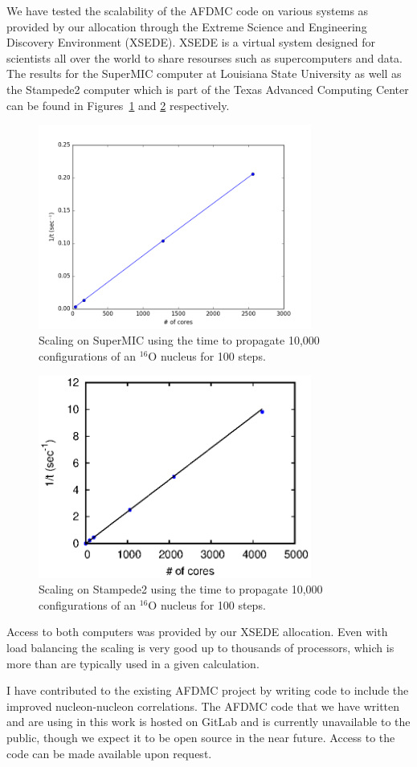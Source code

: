 We have tested the scalability of the AFDMC code on various systems as provided by our allocation through the Extreme Science and Engineering Discovery Environment (XSEDE). XSEDE is a virtual system designed for scientists all over the world to share resourses such as supercomputers and data. The results for the SuperMIC computer at Louisiana State University as well as the Stampede2 computer which is part of the Texas Advanced Computing Center can be found in Figures~\ref{fig:supermic} and \ref{fig:stampede2} respectively.
\begin{figure}[h!]
   \centering
   \includegraphics[width=0.8\textwidth]{figures/supermic.png}
   \caption{Scaling on SuperMIC using the time to propagate 10,000 configurations of an $^{16}$O nucleus for 100 steps.}
   \label{fig:supermic}
\end{figure}
\begin{figure}[h!]
   \centering
   \includegraphics[width=0.8\textwidth]{figures/stampede.eps}
   \caption{Scaling on Stampede2 using the time to propagate 10,000 configurations of an $^{16}$O nucleus for 100 steps.}
   \label{fig:stampede2}
\end{figure}
Access to both computers was provided by our XSEDE allocation. Even with load balancing the scaling is very good up to thousands of processors, which is more than are typically used in a given calculation.

I have contributed to the existing AFDMC project by writing code to include the improved nucleon-nucleon correlations. The AFDMC code that we have written and are using in this work is hosted on GitLab and is currently unavailable to the public, though we expect it to be open source in the near future. Access to the code can be made available upon request.
